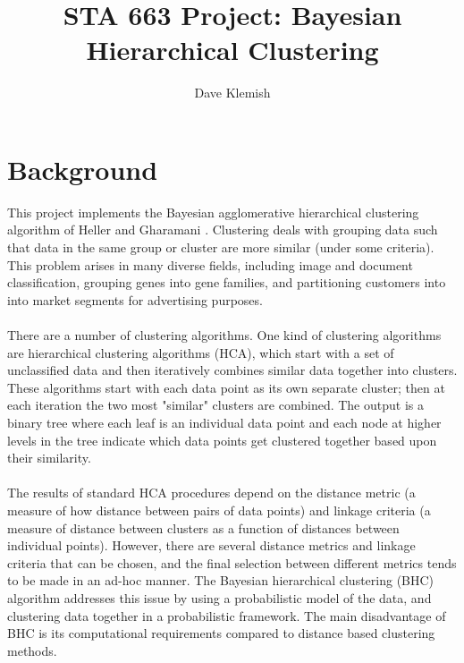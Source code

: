 \documentclass{article}
\begin{document}
\author{Dave Klemish \vspace{-5pt}}
\title{\vspace{-50pt}STA 663 Project: Bayesian Hierarchical Clustering \vspace{-5pt}}

\maketitle

\section{Background}
This project implements the Bayesian agglomerative hierarchical clustering algorithm of Heller and Gharamani \cite{Heller}.  Clustering deals with grouping data such that data in the same group or cluster are more similar (under some criteria).  This problem arises in many diverse fields, including image and document classification, grouping genes into gene families, and partitioning customers into into market segments for advertising purposes.
\\
\\
There are a number of clustering algorithms.  One kind of clustering algorithms are hierarchical clustering algorithms (HCA), which start with a set of unclassified data and then iteratively combines similar data together into clusters.  These algorithms start with each data point as its own separate cluster; then at each iteration the two most "similar" clusters are combined.  The output is a binary tree where each leaf is an individual data point and each node at higher levels in the tree indicate which data points get clustered together based upon their similarity.  
\\
\\
The results of standard HCA procedures depend on the distance metric (a measure of how distance between pairs of data  points) and linkage criteria (a measure of distance between clusters as a function of distances between individual points).  However, there are several distance metrics and linkage criteria that can be chosen, and the final selection between different metrics tends to be made in an ad-hoc manner.  The Bayesian hierarchical clustering (BHC) algorithm addresses this issue by using a probabilistic model of the data, and clustering data together in a probabilistic framework.  The main disadvantage of BHC is its computational requirements compared to distance based clustering methods.
\end{document}
